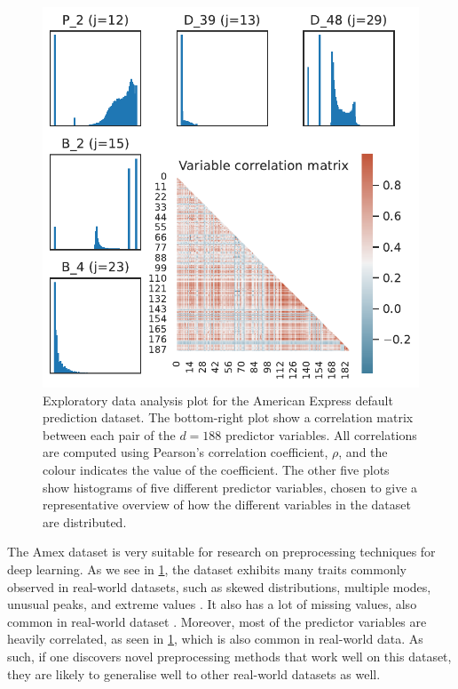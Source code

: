 \documentclass{statsmsc}
\begin{document}
{%
\begin{figure}
\begin{center}
    \includegraphics[scale=1]{figures/amex_data_eda_plot.pdf}
\end{center}
\caption{
    Exploratory data analysis plot for the American Express default prediction
    dataset.  The bottom-right plot show a correlation matrix between each pair
    of the $d=188$ predictor variables. All correlations are computed using
    Pearson's correlation coefficient, $\rho$, and the colour indicates the
    value of the coefficient.  The other five plots show histograms of five
    different predictor variables, chosen to give a representative overview of
    how the different variables in the dataset are distributed.
}
\label{fig:amex_eda}
\end{figure}


The Amex dataset is very suitable for research on preprocessing techniques for
deep learning. As we see in \cref{fig:amex_eda}, the dataset exhibits many traits commonly observed in
real-world datasets, such as skewed distributions, multiple modes, unusual
peaks, and extreme values \citep{nawi}. It also has a lot of missing values, also common in
real-world dataset \citep{nawi, brits}. Moreover, most of the predictor variables are heavily
correlated, as seen in \cref{fig:amex_eda}, which is also common in real-world data.
As such, if one discovers novel preprocessing methods that
work well on this dataset, they are likely to generalise well to other real-world datasets as well.

}
\end{document}
